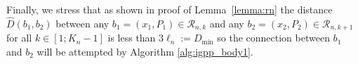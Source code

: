\documentclass[Afour,sageh,times]{sagej}
\begin{document}
Finally, we stress that as shown in proof of Lemma~\ref{lemma:rn} the distance $\hat{D}(b_1,b_2)$ between any $b_1=(x_1,P_1)\in\mathcal{R}_{n,k}$ and any $b_2=(x_2,P_2)\in\mathcal{R}_{n,k+1}$ for all $k\in[1;K_n-1]$ is less than $3\ell_n :=D_{\text{min}}$ so the connection between $b_1$ and $b_2$ will be attempted by Algorithm \ref{alg:igpp_body1}. 

\end{document}
